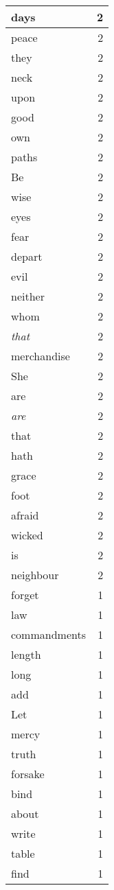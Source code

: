 \begin{center}
\begin{longtable}{l|r}
days & 2\\ \hline 
peace & 2\\ \hline 
they & 2\\ \hline 
neck & 2\\ \hline 
upon & 2\\ \hline 
good & 2\\ \hline 
own & 2\\ \hline 
paths & 2\\ \hline 
Be & 2\\ \hline 
wise & 2\\ \hline 
eyes & 2\\ \hline 
fear & 2\\ \hline 
depart & 2\\ \hline 
evil & 2\\ \hline 
neither & 2\\ \hline 
whom & 2\\ \hline 
\emph{that} & 2\\ \hline 
merchandise & 2\\ \hline 
She & 2\\ \hline 
are & 2\\ \hline 
\emph{are} & 2\\ \hline 
that & 2\\ \hline 
hath & 2\\ \hline 
grace & 2\\ \hline 
foot & 2\\ \hline 
afraid & 2\\ \hline 
wicked & 2\\ \hline 
is & 2\\ \hline 
neighbour & 2\\ \hline 
forget & 1\\ \hline 
law & 1\\ \hline 
commandments & 1\\ \hline 
length & 1\\ \hline 
long & 1\\ \hline 
add & 1\\ \hline 
Let & 1\\ \hline 
mercy & 1\\ \hline 
truth & 1\\ \hline 
forsake & 1\\ \hline 
bind & 1\\ \hline 
about & 1\\ \hline 
write & 1\\ \hline 
table & 1\\ \hline 
find & 1\\ \hline 

\end{longtable}
\end{center}
